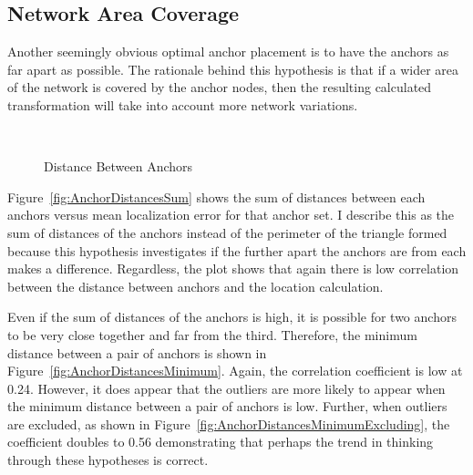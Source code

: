 \subsection{Network Area Coverage}

Another seemingly obvious optimal anchor placement is to have the anchors as far apart as possible.  The rationale behind this hypothesis is that if a wider area of the network is covered by the anchor nodes, then the resulting calculated transformation will take into account more network variations.  

\begin{figure}
  \centering
		\\

	\caption{Distance Between Anchors}
    \label{fig:AnchorDistances}
\end{figure}

Figure~\ref{fig:AnchorDistancesSum} shows the sum of distances between each anchors versus mean localization error for that anchor set. I describe this as the sum of distances of the anchors instead of the perimeter of the triangle formed because this hypothesis investigates if the further apart the anchors are from each makes a difference. Regardless, the plot shows that again there is low correlation between the distance between anchors and the location calculation.  

Even if the sum of distances of the anchors is high, it is possible for two anchors to be very close together and far from the third.  Therefore, the minimum distance between a pair of anchors is shown in Figure~\ref{fig:AnchorDistancesMinimum}.  Again, the correlation coefficient is low at 0.24.  However, it does appear that the outliers are more likely to appear when the minimum distance between a pair of anchors is low.  Further, when outliers are excluded, as shown in Figure~\ref{fig:AnchorDistancesMinimumExcluding}, the coefficient doubles to 0.56 demonstrating that perhaps the trend in thinking through these hypotheses is correct.

